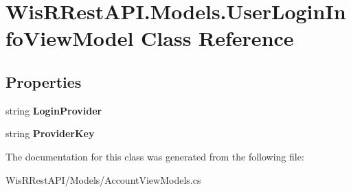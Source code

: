 \hypertarget{class_wis_r_rest_a_p_i_1_1_models_1_1_user_login_info_view_model}{}\section{Wis\+R\+Rest\+A\+P\+I.\+Models.\+User\+Login\+Info\+View\+Model Class Reference}
\label{class_wis_r_rest_a_p_i_1_1_models_1_1_user_login_info_view_model}
\subsection*{Properties}
\begin{DoxyCompactItemize}
\item 
\hypertarget{class_wis_r_rest_a_p_i_1_1_models_1_1_user_login_info_view_model_a2653661079eb36a4f501f2a80f8c2659}{}string {\bfseries Login\+Provider}\label{class_wis_r_rest_a_p_i_1_1_models_1_1_user_login_info_view_model_a2653661079eb36a4f501f2a80f8c2659}

\item 
\hypertarget{class_wis_r_rest_a_p_i_1_1_models_1_1_user_login_info_view_model_a748f28fae88e1e6f26de6496c027c5bf}{}string {\bfseries Provider\+Key}\label{class_wis_r_rest_a_p_i_1_1_models_1_1_user_login_info_view_model_a748f28fae88e1e6f26de6496c027c5bf}

\end{DoxyCompactItemize}


The documentation for this class was generated from the following file\+:\begin{DoxyCompactItemize}
\item 
Wis\+R\+Rest\+A\+P\+I/\+Models/Account\+View\+Models.\+cs\end{DoxyCompactItemize}
